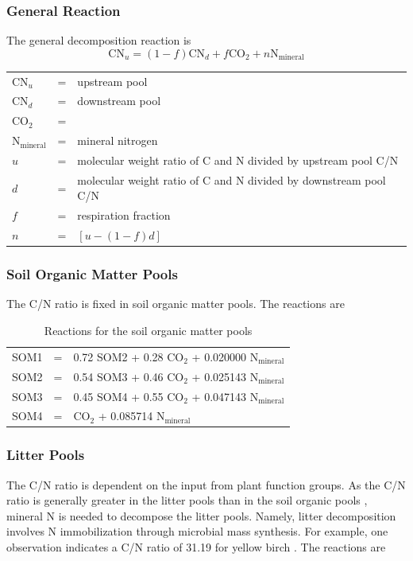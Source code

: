 \documentclass[12pt, a4paper]{article}
\begin{document}
\subsubsection{General Reaction}
The general decomposition reaction is
\begin{equation}
\label{rxnclmcn}
\text{CN}_u = (1 - f) \text{CN}_d + f \text{CO}_2 + n \text{N}_\text{mineral}
\end{equation}

\begin{tabular}{lll}
$\text{CN}_u$ & = & upstream pool \\
$\text{CN}_d$ & = & downstream pool \\
$\text{CO}_2$ & = & \\
$\text{N}_\text{mineral}$ & = &mineral nitrogen \\
$u$ & = & molecular weight ratio of C and N divided by upstream pool C/N \\
$d$ & = & molecular weight ratio of C and N divided by downstream pool C/N \\
$f$ & = & respiration fraction \\
$n$ & = & $[u - (1 - f)d]$
\end{tabular}

\subsubsection{Soil Organic Matter Pools}
The C/N ratio is fixed in soil organic matter pools. The reactions are

\begin{table}[h]
\caption{Reactions for the soil organic matter pools}
\begin{center}
\begin{tabular}{lll}
SOM1 & = & 0.72 SOM2 + 0.28 $\text{CO}_2$ + 0.020000 $\text{N}_ \text{mineral}$ \\
SOM2 & = & 0.54 SOM3 + 0.46 $\text{CO}_2$ + 0.025143 $\text{N}_\text{mineral}$  \\
SOM3 & = & 0.45 SOM4 + 0.55 $\text{CO}_2$ + 0.047143 $\text{N}_ \text{mineral}$ \\
SOM4 & = & $\text{CO}_2$ + 0.085714 $\text{N}_\text{mineral}$  
\end{tabular}
\end{center}
\label{SOMReactions}
\end{table}

\subsubsection{Litter Pools}
The C/N ratio is dependent on the input from plant function groups. As the C/N ratio is generally greater in the litter pools than in the soil organic pools \cite{Adairetal2008}, mineral N is needed to decompose the litter pools. Namely, litter decomposition involves N immobilization through microbial mass synthesis. For example, one observation indicates a C/N ratio of 31.19 for yellow birch \cite{Adairetal2008}. The reactions are
\end{document}
